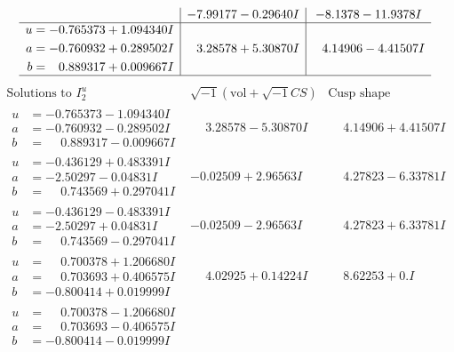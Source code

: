 \documentclass[1p]{elsarticle_modified}
\theoremstyle{definition}
\newcommand{\I}{\sqrt{-1}}
\begin{document}
$$\begin{array}{c|c|c}
 & -7.99177 - 0.29640 I & -8.1378 - 11.9378 I \\ \hline\begin{aligned}
u &= -0.765373 + 1.094340 I \\
a &= -0.760932 + 0.289502 I \\
b &= \phantom{-}0.889317 + 0.009667 I\end{aligned}
 & \phantom{-}3.28578 + 5.30870 I & \phantom{-}4.14906 - 4.41507 I\\
 \hline 
 \end{array}$$\newpage$$\begin{array}{c|c|c}  
\text{Solutions to }I^u_{2}& \I (\text{vol} + \sqrt{-1}CS) & \text{Cusp shape}\\
 \hline 
\begin{aligned}
u &= -0.765373 - 1.094340 I \\
a &= -0.760932 - 0.289502 I \\
b &= \phantom{-}0.889317 - 0.009667 I\end{aligned}
 & \phantom{-}3.28578 - 5.30870 I & \phantom{-}4.14906 + 4.41507 I \\ \hline\begin{aligned}
u &= -0.436129 + 0.483391 I \\
a &= -2.50297 - 0.04831 I \\
b &= \phantom{-}0.743569 + 0.297041 I\end{aligned}
 & -0.02509 + 2.96563 I & \phantom{-}4.27823 - 6.33781 I \\ \hline\begin{aligned}
u &= -0.436129 - 0.483391 I \\
a &= -2.50297 + 0.04831 I \\
b &= \phantom{-}0.743569 - 0.297041 I\end{aligned}
 & -0.02509 - 2.96563 I & \phantom{-}4.27823 + 6.33781 I \\ \hline\begin{aligned}
u &= \phantom{-}0.700378 + 1.206680 I \\
a &= \phantom{-}0.703693 + 0.406575 I \\
b &= -0.800414 + 0.019999 I\end{aligned}
 & \phantom{-}4.02925 + 0.14224 I & \phantom{-}8.62253 + 0. I\phantom{ +0.000000I} \\ \hline\begin{aligned}
u &= \phantom{-}0.700378 - 1.206680 I \\
a &= \phantom{-}0.703693 - 0.406575 I \\
b &= -0.800414 - 0.019999 I\end{aligned}

\end{array}$$
\end{document}
